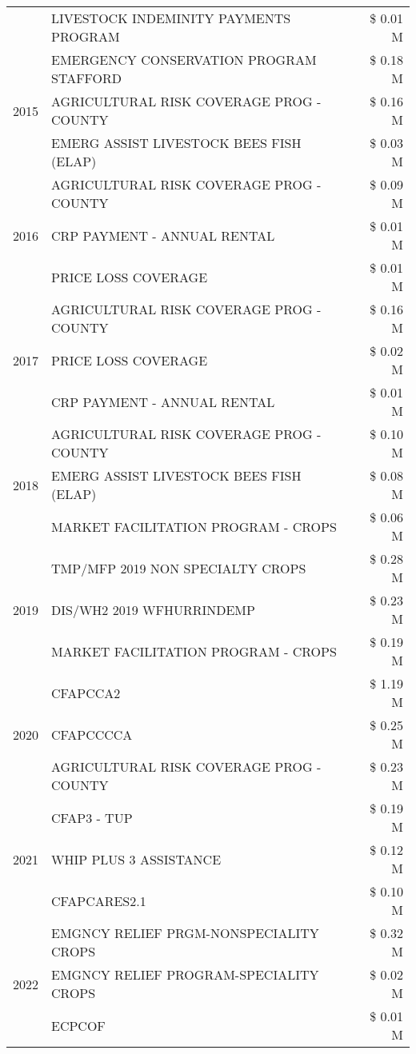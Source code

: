 \begin{tabular}{llr}
 & LIVESTOCK INDEMINITY PAYMENTS PROGRAM & \$ 0.01 M \\
\cline{1-3}
\multirow[t]{3}{*}{2015} & EMERGENCY CONSERVATION PROGRAM STAFFORD & \$ 0.18 M \\
 & AGRICULTURAL RISK COVERAGE PROG - COUNTY & \$ 0.16 M \\
 & EMERG ASSIST LIVESTOCK BEES FISH (ELAP) & \$ 0.03 M \\
\cline{1-3}
\multirow[t]{3}{*}{2016} & AGRICULTURAL RISK COVERAGE PROG - COUNTY & \$ 0.09 M \\
 & CRP PAYMENT - ANNUAL RENTAL & \$ 0.01 M \\
 & PRICE LOSS COVERAGE & \$ 0.01 M \\
\cline{1-3}
\multirow[t]{3}{*}{2017} & AGRICULTURAL RISK COVERAGE PROG - COUNTY & \$ 0.16 M \\
 & PRICE LOSS COVERAGE & \$ 0.02 M \\
 & CRP PAYMENT - ANNUAL RENTAL & \$ 0.01 M \\
\cline{1-3}
\multirow[t]{3}{*}{2018} & AGRICULTURAL RISK COVERAGE PROG - COUNTY & \$ 0.10 M \\
 & EMERG ASSIST LIVESTOCK BEES FISH (ELAP) & \$ 0.08 M \\
 & MARKET FACILITATION PROGRAM - CROPS & \$ 0.06 M \\
\cline{1-3}
\multirow[t]{3}{*}{2019} & TMP/MFP 2019 NON SPECIALTY CROPS & \$ 0.28 M \\
 & DIS/WH2 2019 WFHURRINDEMP & \$ 0.23 M \\
 & MARKET FACILITATION PROGRAM - CROPS & \$ 0.19 M \\
\cline{1-3}
\multirow[t]{3}{*}{2020} & CFAPCCA2 & \$ 1.19 M \\
 & CFAPCCCCA & \$ 0.25 M \\
 & AGRICULTURAL RISK COVERAGE PROG - COUNTY & \$ 0.23 M \\
\cline{1-3}
\multirow[t]{3}{*}{2021} & CFAP3 - TUP & \$ 0.19 M \\
 & WHIP PLUS 3 ASSISTANCE & \$ 0.12 M \\
 & CFAPCARES2.1 & \$ 0.10 M \\
\cline{1-3}
\multirow[t]{3}{*}{2022} & EMGNCY RELIEF PRGM-NONSPECIALITY CROPS & \$ 0.32 M \\
 & EMGNCY RELIEF PROGRAM-SPECIALITY CROPS & \$ 0.02 M \\
 & ECPCOF & \$ 0.01 M \\
\cline{1-3}
\bottomrule
\end{tabular}
